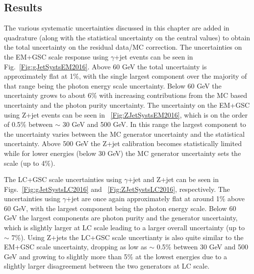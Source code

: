 \subsection{Results}

The various systematic uncertainties discussed in this chapter are added in quadrature (along with the statistical uncertainty on the central values) to obtain the total uncertainty on the residual data/MC correction.  
The uncertainties on the EM+GSC scale response using $\gamma$+jet events can be seen in Fig.~\ref{Fig:gJetSystsEM2016}.  
Above 60 GeV the total uncertainty is approximately flat at 1\%, with the single largest component over the majority of that range being the photon energy scale uncertainty.  
Below 60 GeV the uncertainty grows to about 6\% with increasing contributions from the MC based uncertainty and the photon purity uncertainty.  
The uncertainty on the EM+GSC using Z+jet events can be seen in ~\ref{Fig:ZJetSystsEM2016}, which is on the order of 0.5\% between $\sim$ 30 GeV and 500 GeV.  
In this range the largest component to the uncertainty varies between the MC generator uncertainty and the statistical uncertainty.  
Above 500 GeV the Z+jet calibration becomes statistically limited while for lower energies (below 30 GeV) the MC generator uncertainty sets the scale (up to 4\%). 

The LC+GSC scale uncertainties using $\gamma$+jet and Z+jet can be seen in Figs.~\ref{Fig:gJetSystsLC2016} and ~\ref{Fig:ZJetSystsLC2016}, respectively.  
The uncertainties using $\gamma$+jet are once again approximately flat at around 1\% above 60 GeV, with the largest component being the photon energy scale.  
Below 60 GeV the largest components are photon purity and the generator uncertainty, which is slightly larger at LC scale leading to a larger overall uncertainty (up to $\sim$ 7\%).  
Using Z+jets the LC+GSC scale uncertianty is also quite similar to the EM+GSC scale uncertainty, dropping as low as $\sim$ 0.5\% between 30 GeV and 500 GeV and growing to slightly more than 5\% at the lowest energies due to a slightly larger disagreement between the two generators at LC scale.  

